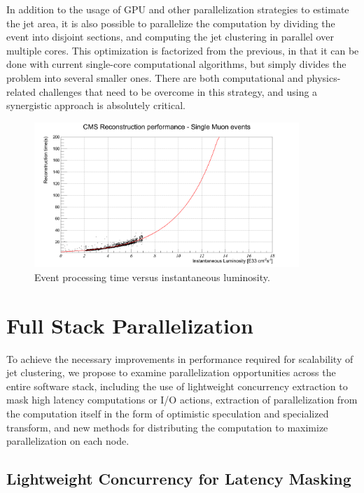 \documentclass[12pt]{article}
\begin{document}
In addition to the usage of GPU and other parallelization strategies
to estimate the jet area, it is also possible to parallelize the
computation by dividing the event into disjoint sections, and
computing the jet clustering in parallel over multiple cores. This
optimization is factorized from the previous, in that it can be done
with current single-core computational algorithms, but simply divides
the problem into several smaller ones. There are both computational
and physics-related challenges that need to be overcome in this
strategy, and using a synergistic approach is absolutely critical. 



\begin{figure}[h!]
    \centering
    \includegraphics[width=100mm]{lumitpeSingleMu-fitted2.png}
    \caption{\label{lumitpeSingleMu} Event processing time versus
      instantaneous luminosity.}
\end{figure}



\section{Full Stack Parallelization}

To achieve the necessary improvements in performance required for scalability
of jet clustering, we propose to examine parallelization opportunities across
the entire software stack, including the use of lightweight concurrency
extraction to mask high latency computations or I/O actions, extraction of
parallelization from the computation itself in the form of optimistic speculation
and specialized transform, and new methods for distributing the computation to
maximize parallelization on each node. 

\subsection{Lightweight Concurrency for Latency Masking}
\end{document}
